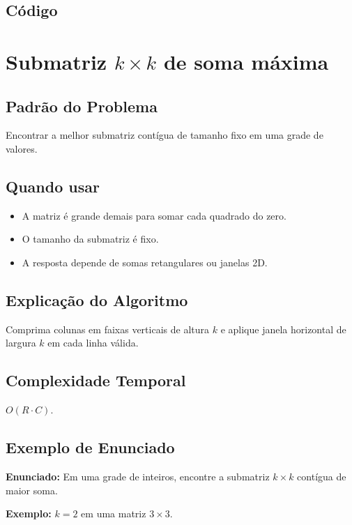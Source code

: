 \subsection{Código}

\section{Submatriz $k \times k$ de soma máxima}

\subsection{Padrão do Problema}
Encontrar a melhor submatriz contígua de tamanho fixo em uma grade de valores.

\subsection{Quando usar}
\begin{itemize}[nosep]
  \item A matriz é grande demais para somar cada quadrado do zero.
  \item O tamanho da submatriz é fixo.
  \item A resposta depende de somas retangulares ou janelas 2D.
\end{itemize}

\subsection{Explicação do Algoritmo}
Comprima colunas em faixas verticais de altura $k$ e aplique janela horizontal de largura $k$ em cada linha válida.

\subsection{Complexidade Temporal}
$O(R \cdot C)$.

\subsection{Exemplo de Enunciado}
\begin{exemplodiabox}
\textbf{Enunciado:} Em uma grade de inteiros, encontre a submatriz $k \times k$ contígua de maior soma.

\textbf{Exemplo:} $k = 2$ em uma matriz $3 \times 3$.
\end{exemplodiabox}

